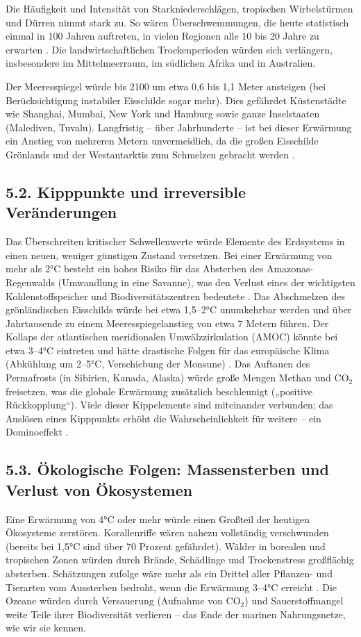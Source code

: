 \documentclass[12pt, a4paper]{article}
\begin{document}
	Die Häufigkeit und Intensität von Starkniederschlägen, tropischen Wirbelstürmen und Dürren
	nimmt stark zu. So wären Überschwemmungen, die heute statistisch einmal in 100 Jahren
	auftreten, in vielen Regionen alle 10 bis 20 Jahre zu erwarten \cite{ipcc2021}. Die
	landwirtschaftlichen Trockenperioden würden sich verlängern, insbesondere im Mittelmeerraum,
	im südlichen Afrika und in Australien.
	
	Der Meeresspiegel würde bis 2100 um etwa 0,6 bis 1,1 Meter ansteigen (bei Berücksichtigung
	instabiler Eisschilde sogar mehr). Dies gefährdet Küstenstädte wie Shanghai, Mumbai, New
	York und Hamburg sowie ganze Inselstaaten (Malediven, Tuvalu). Langfristig – über Jahrhunderte
	– ist bei dieser Erwärmung ein Anstieg von mehreren Metern unvermeidlich, da die großen
	Eisschilde Grönlands und der Westantarktis zum Schmelzen gebracht werden \cite{ipcc2021}.
	
	\subsection*{5.2. Kipppunkte und irreversible Veränderungen}
	Das Überschreiten kritischer Schwellenwerte würde Elemente des Erdsystems in einen neuen,
	weniger günstigen Zustand versetzen. Bei einer Erwärmung von mehr als 2°C besteht ein hohes
	Risiko für das Absterben des Amazonas-Regenwalds (Umwandlung in eine Savanne), was den
	Verlust eines der wichtigsten Kohlenstoffspeicher und Biodiversitätszentren bedeutete
	\cite{carbonbrief2025}. Das Abschmelzen des grönländischen Eisschilds würde bei etwa
	1,5–2°C unumkehrbar werden und über Jahrtausende zu einem Meeresspiegelanstieg von etwa
	7 Metern führen. Der Kollaps der atlantischen meridionalen Umwälzzirkulation (AMOC) könnte
	bei etwa 3–4°C eintreten und hätte drastische Folgen für das europäische Klima (Abkühlung
	um 2–5°C, Verschiebung der Monsune) \cite{wunderling2022}. Das Auftauen des Permafrosts
	(in Sibirien, Kanada, Alaska) würde große Mengen Methan und CO$_2$ freisetzen, was die
	globale Erwärmung zusätzlich beschleunigt („positive Rückkopplung“). Viele dieser
	Kippelemente sind miteinander verbunden; das Auslösen eines Kipppunkts erhöht die
	Wahrscheinlichkeit für weitere – ein Dominoeffekt \cite{carbonbrief2025}.
	
	\subsection*{5.3. Ökologische Folgen: Massensterben und Verlust von Ökosystemen}
	Eine Erwärmung von 4°C oder mehr würde einen Großteil der heutigen Ökosysteme zerstören.
	Korallenriffe wären nahezu vollständig verschwunden (bereits bei 1,5°C sind über 70 Prozent
	gefährdet). Wälder in borealen und tropischen Zonen würden durch Brände, Schädlinge und
	Trockenstress großflächig absterben. Schätzungen zufolge wäre mehr als ein Drittel aller
	Pflanzen- und Tierarten vom Aussterben bedroht, wenn die Erwärmung 3–4°C erreicht \cite{ipcc2021}.
	Die Ozeane würden durch Versauerung (Aufnahme von CO$_2$) und Sauerstoffmangel weite Teile
	ihrer Biodiversität verlieren – das Ende der marinen Nahrungsnetze, wie wir sie kennen.
	
\end{document}
